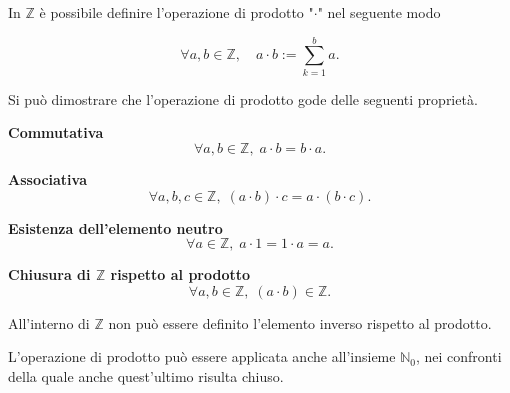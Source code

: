 In $\mathbb{Z}$ è possibile definire l'operazione di prodotto "$\cdot$" nel seguente modo

\[
    \forall a, b \in \mathbb{Z}, \quad a \cdot b := \sum_{k=1}^{b} a.
\]

Si può dimostrare che l'operazione di prodotto gode delle seguenti proprietà.

\begin{property}
    \textbf{Commutativa}
    \[\forall a, b \in \mathbb{Z}, \;a \cdot b = b \cdot a.\]
\end{property}
\begin{property}
    \textbf{Associativa}
    \[\forall a, b, c \in \mathbb{Z}, \;(a \cdot b) \cdot c = a \cdot (b \cdot c).\]
\end{property}
\begin{property}
    \textbf{Esistenza dell'elemento neutro}
    \[\forall a \in \mathbb{Z}, \; a \cdot 1 = 1 \cdot a = a.\]
\end{property}
\begin{property}
    \textbf{Chiusura di $\mathbb{Z}$ rispetto al prodotto}
    \[\forall a, b \in \mathbb{Z}, \; (a \cdot b) \in \mathbb{Z}.\]
\end{property}

\begin{observation}
    All'interno di $\mathbb{Z}$ non può essere definito l'elemento inverso rispetto al prodotto.
\end{observation}
\begin{observation}
    L'operazione di prodotto può essere applicata anche all'insieme $\mathbb{N}_0$, nei confronti della quale
    anche quest'ultimo risulta chiuso.
\end{observation}
